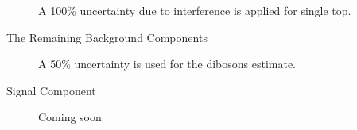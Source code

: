 \begin{description}
A 100\% uncertainty due to interference is applied for single top.

\item[The Remaining Background Components]

A 50\% uncertainty is used for the dibosons estimate.
\item[Signal Component] 

  {\color{red} Coming soon}

\end{description}
